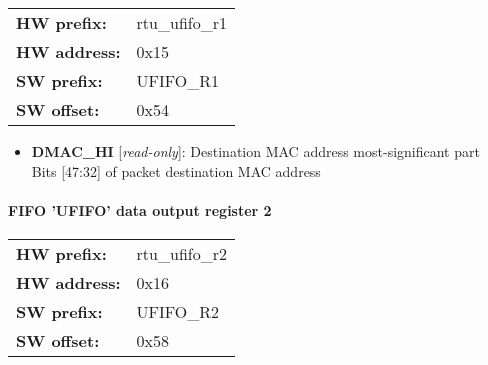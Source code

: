 \begin{tabular}{l l }
{\bf HW prefix:}  & rtu\_ufifo\_r1\\
{\bf HW address:}  & 0x15\\
{\bf SW prefix:}  & UFIFO\_R1\\
{\bf SW offset:}  & 0x54\\
\end{tabular}


\vspace{12pt}
\noindent
{}

\begin{itemize}
\item \begin{small}
{\bf 
DMAC\_HI
} [\emph{read-only}]: Destination MAC address most-significant part
\\
Bits [47:32] of packet destination MAC address
\end{small}
\end{itemize}
\paragraph*{FIFO 'UFIFO' data output register 2}\vspace{12pt}

\begin{tabular}{l l }
{\bf HW prefix:}  & rtu\_ufifo\_r2\\
{\bf HW address:}  & 0x16\\
{\bf SW prefix:}  & UFIFO\_R2\\
{\bf SW offset:}  & 0x58\\
\end{tabular}


